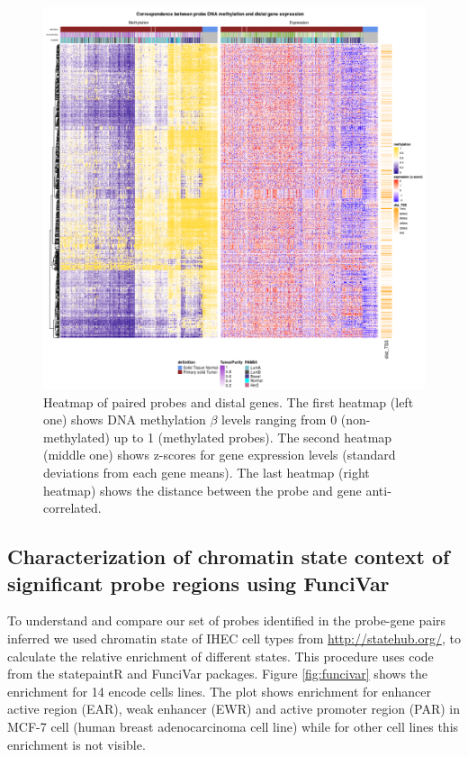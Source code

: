 \begin{figure}[ht!]
\centering
\includegraphics[width=1.0\textwidth]{images/heatmap.png}
\caption{\label{fig:heatmap} Heatmap of paired probes and distal genes. The first heatmap (left one) shows DNA methylation $\beta$ levels ranging from 0 (non-methylated) up to 1 (methylated probes).
The second heatmap (middle one) shows z-scores for gene expression levels (standard deviations from each gene means). The last heatmap (right heatmap) shows the distance between the probe
and gene anti-correlated.}
\end{figure}

\begin{minipage}{\linewidth}

\end{minipage}

\clearpage

\subsection*{Characterization of chromatin state context of significant probe regions using FunciVar}

To understand and compare our set of probes identified in the probe-gene pairs inferred
we used chromatin state of IHEC cell types
from \url{http://statehub.org/}, to calculate the relative enrichment of
different states.
This procedure uses code from the statepaintR \cite{statepaintr} and FunciVar \cite{funcivar} packages.
Figure \ref{fig:funcivar} shows the enrichment for 14 encode cells lines.
The plot shows enrichment for enhancer active region (EAR), weak enhancer (EWR)
and active promoter region (PAR) in MCF-7 cell (human breast adenocarcinoma cell line)
while for other cell lines this enrichment is not visible.

